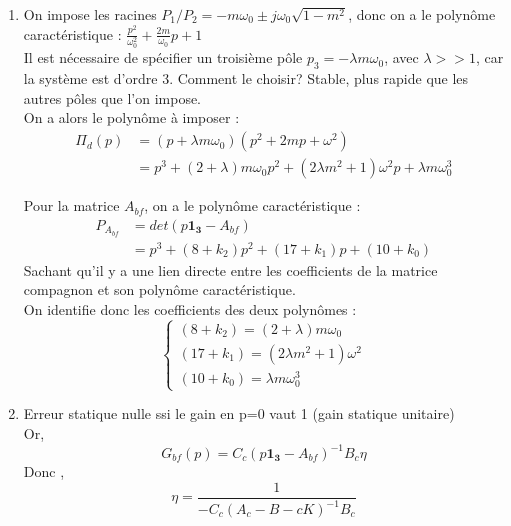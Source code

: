 \documentclass[../main.tex]{subfiles}
\begin{document}
\begin{enumerate}
On a donc pour l'équation d'état :
\begin{align*}
\dot{x_c} &= A_c x_c + B_c u\\
&= (A_c - B_cK)x_c + \eta B_c e\\
&= A_{bf}x_c + \eta B_c e
\intertext{et pour l'éuation d'obersation : }
y = C_c x_c
\end{align*}

\item On impose les racines $P_1/P_2 = -m\omega_0 \pm j \omega_0\sqrt{1-m^2}$, donc on a le polynôme caractéristique : $\frac{p^2}{\omega_0^2} + \frac{2m}{\omega_0}p + 1$\\
Il est nécessaire de spécifier un troisième pôle $p_3 = -\lambda m \omega_0$, avec $\lambda >> 1$, car la système est d'ordre 3. Comment le choisir? Stable, plus rapide que les autres pôles que l'on impose.\\

On a alors le polynôme à imposer :
\begin{align*}
\Pi_d(p) &= (p + \lambda m \omega_0)(p^2 + 2mp + \omega^2)\\
&= p^3 + (2+\lambda)m\omega_0 p^2 + (2\lambda m^2 + 1) \omega^2 p + \lambda m \omega_0^3
\end{align*}

Pour la matrice $A_{bf}$, on a le polynôme caractéristique :
\begin{align*}
P_{A_{bf}} &= det(p\mathbf{1_3} - A_{bf})\\
&=p^3 + (8+k_2)p^2 + (17+k_1)p + (10+k_0)
\end{align*}
Sachant qu'il y a une lien directe entre les coefficients de la matrice compagnon et son polynôme caractéristique.\\
On identifie donc les coefficients des deux polynômes :
\[\left \{ \begin{matrix}
(8+k_2) = (2+\lambda)m\omega_0\\
(17+k_1) = (2\lambda m^2 + 1) \omega^2\\
(10+k_0) = \lambda m \omega_0^3
\end{matrix} \right. \]

\item Erreur statique nulle ssi le gain en p=0 vaut 1 (gain statique unitaire)\\
Or, \[G_{bf}(p) = C_c(p \mathbf{1_3}-A_{bf})^{-1}B_c \eta \]
Donc , \[ \eta = \frac{1}{-C_c(A_c-B-cK)^{-1}B_c}\]
\end{enumerate}
\end{document}
